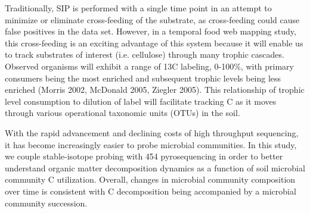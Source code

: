 Traditionally, SIP is performed with a single time point in an attempt to minimize or eliminate cross-feeding of the substrate, as cross-feeding could cause false positives in the data set.  However, in a temporal food web mapping study, this cross-feeding is an exciting advantage of this system because it will enable us to track substrates of interest (i.e. cellulose) through many trophic cascades.  Observed organisms will exhibit a range of 13C labeling, 0-100\%, with primary consumers being the most enriched and subsequent trophic levels being less enriched (Morris 2002, McDonald 2005, Ziegler 2005).  This relationship of trophic level consumption to dilution of label will facilitate tracking C as it moves through various operational taxonomic units (OTUs) in the soil.  


With the rapid advancement and declining costs of high throughput sequencing, it has become increasingly easier to probe microbial communities.  In this study, we couple stable-isotope probing with 454 pyrosequencing in order to better understand organic matter decomposition dynamics as a function of soil microbial community C utilization. Overall, changes in microbial community composition over time is consistent with C decomposition being accompanied by a microbial community succession. 




